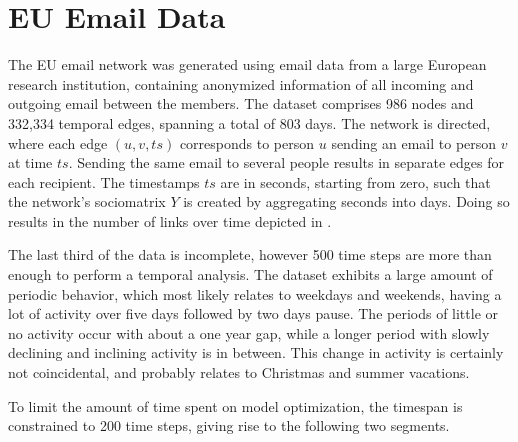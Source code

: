 \section{EU Email Data}

The EU email network was generated using email data from a large European research institution, containing anonymized information of all incoming and outgoing email between the members. The dataset comprises 986 nodes and 332,334 temporal edges, spanning a total of 803 days. The network is directed, where each edge $(u,v,ts)$ corresponds to person $u$ sending an email to person $v$ at time $ts$. Sending the same email to several people results in separate edges for each recipient. The timestamps $ts$ are in seconds, starting from zero, such that the network's sociomatrix $Y$ is created by aggregating seconds into days. Doing so results in the number of links over time depicted in .

The last third of the data is incomplete, however 500 time steps are more than enough to perform a temporal analysis. 
The dataset exhibits a large amount of periodic behavior, which most likely relates to weekdays and weekends, having a lot of activity over five days followed by two days pause. The periods of little or no activity occur with about a one year gap, while a longer period with slowly declining and inclining activity is in between. This change in activity is certainly not coincidental, and probably relates to Christmas and summer vacations.

To limit the amount of time spent on model optimization, the timespan is constrained to 200 time steps, giving rise to the following two segments.
